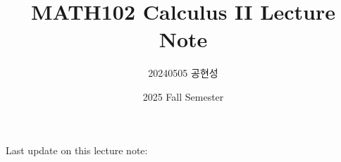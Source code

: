 \documentclass[10pt, oneside]{article}
\title{MATH102 Calculus II Lecture Note}
\author{20240505 공현성}
\date{2025 Fall Semester}
\begin{document}
\maketitle

Last update on this lecture note: \fbox{\today}

\tableofcontents

\vspace{.25in}








\end{document}
